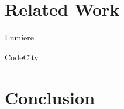 \documentclass[runningheads]{llncs}
\newcommand{\seclabel}[1]{\label{sec:#1}}
\begin{document}
\section{Related Work} \seclabel{relatedwork}

Lumiere~\cite{Oliv09a}

CodeCity~\cite{Wett08d}

\section{Conclusion} \seclabel{conclusion}



%



\end{document}

